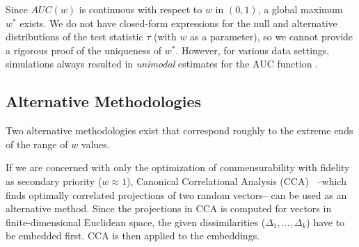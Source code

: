 \documentclass[12pt]{article} %
\begin{document}
Since $AUC(w)$ is continuous with respect to $w$ in $(0,1)$, a global maximum $w^*$ exists. We do not have closed-form expressions for the null and alternative distributions of the test statistic $\tau$ (with $w$ as a parameter), so we cannot provide a rigorous proof of the uniqueness of $w^*$. However, for various data settings, simulations always resulted in \emph{unimodal}  estimates for the AUC function .

\subsection{Alternative Methodologies}

Two alternative methodologies exist that correspond roughly to the extreme ends of the range of $w$ values. 

If we are concerned with only the optimization of commensurability with fidelity as secondary priority ($w\approx 1$), Canonical Correlational Analysis (CCA)~\cite{Hardoon2004} --which finds optimally correlated projections of two random vectors-- can be used as an alternative method. Since the projections in CCA is computed  for vectors in finite-dimensional Euclidean space, the given dissimilarities ($\Delta_1,\ldots,\Delta_k$) have to be embedded first. CCA is then  applied to the  embeddings.
\end{document}
